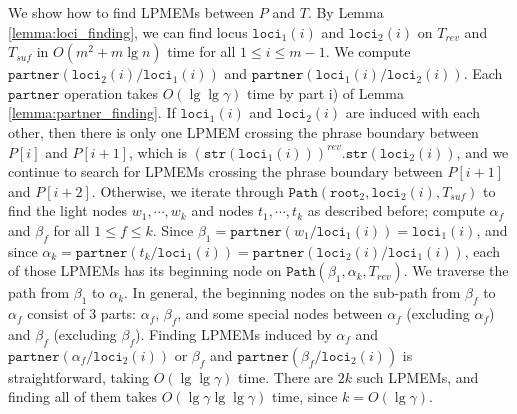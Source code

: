 \documentclass[smallabstract,smallcaptions]{dccpaper}
\def\idtt#1{\ensuremath{\mathtt{#1}}}
\def\str{\idtt{str}}
\def\partner{\idtt{partner}}
\def\path{\idtt{Path}}
\def\loci{\idtt{loci}}
\def\root{\idtt{root}}
\begin{document}
We show how to find LPMEMs between $P$ and $T$.
By Lemma \ref{lemma:loci_finding}, we can find locus $\loci_1(i)$ and $\loci_2(i)$ on $T_{rev}$ and $T_{suf}$ in $O(m^2+m\lg n)$ time for all $1\leq i \leq m-1$.
We compute $\partner(\loci_2(i)/\loci_1(i))$ and $\partner(\loci_1(i)/\loci_2(i))$. %
Each $\partner$ operation takes $O(\lg \lg \gamma)$ time by part i) of Lemma \ref{lemma:partner_finding}.
If $\loci_1(i)$ and $\loci_2(i)$ are induced with each other, then there is only one LPMEM crossing the phrase boundary between $P[i]$ and $P[i+1]$, which is $(\str(\loci_1(i)))^{rev}.\str(\loci_2(i))$, and we continue to search for LPMEMs crossing the phrase boundary between $P[i+1]$ and $P[i+2]$.
Otherwise, we iterate through $\path(\root_2, \loci_2(i), T_{suf})$ to find the light nodes $w_1, \cdots, w_k$ and nodes $t_1, \cdots, t_k$ as described before; compute $\alpha_f$ and $\beta_f$ for all $1\leq f \leq k$.
Since $\beta_1=\partner(w_1/\loci_1(i))=\loci_1(i)$, and since $\alpha_k=\partner(t_k/\loci_1(i))=\partner(\loci_2(i)/\loci_1(i))$, each of those LPMEMs has its beginning node on $\path(\beta_1, \alpha_k, T_{rev})$.
We traverse the path from $\beta_1$ to $\alpha_k$.
In general, the beginning nodes on the sub-path from $\beta_f$ to $\alpha_f$ consist of 3 parts: $\alpha_f$, $\beta_f$, and some special nodes between $\alpha_f$ (excluding $\alpha_f$) and $\beta_f$ (excluding $\beta_f$).
Finding LPMEMs induced by $\alpha_f$ and $\partner(\alpha_f/\loci_2(i))$ or $\beta_f$ and $\partner(\beta_f/\loci_2(i))$ is straightforward, taking $O(\lg \lg \gamma)$ time.
There are $2k$ such LPMEMs, and finding all of them takes $O(\lg \gamma \lg \lg \gamma)$ time, since $k=O(\lg \gamma)$.
\end{document}
